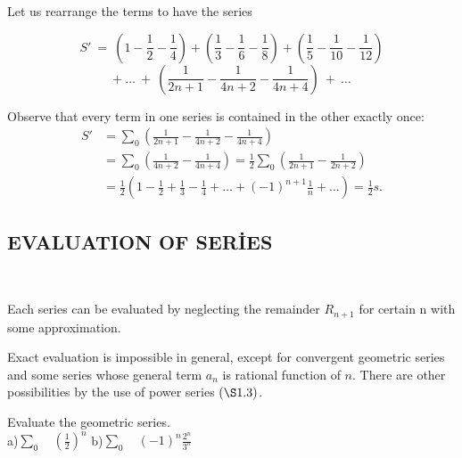 \documentclass[11pt]{amsbook}
\begin{document}
Let us rearrange the terms to have the series 

\[
    S'\:=\:(1-\frac{1}{2} - \frac{1}{4})+(\frac{1}{3} - \frac{1}{6} - \frac{1}{8}) +(\frac{1}{5} - \frac{1}{10} - \frac{1}{12})
\]
\[
    + \:\dots\:+\:(\frac{1}{2n+1} - \frac{1}{4n+2} -\frac{1}{4n+4} ) \:+\:\dots 
\]

Observe that every term in one series is contained in the other exactly once: 
\begin{align*}
    S' &= \sum\limits_{0} \left( \frac{1}{2n+1}-\frac{1}{4n+2}-\frac{1}{4n+4}\right) 
    \\ &= \sum\limits_{0}\left(\frac{1}{4n+2}-\frac{1}{4n+4}\right)=\frac{1}{2}\sum\limits_{0} \left( \frac{1}{2n+1}-\frac{1}{2n+2}\right)
    \\ &= \frac{1}{2}\left(1-\frac{1}{2}+\frac{1}{3}-\frac{1}{4}+\dotsc+\left( -1 \right)^{n+1} \frac{1}{n}+\dotsc \right)=\frac{1}{2} s.
\end{align*}
\subsection{EVALUATION OF SERİES} \ 

Each series can be evaluated by neglecting the remainder $R_{n+1}$ for certain n with some approximation.

Exact evaluation is impossible in general, except for convergent geometric series and some series whose general term $a_n$ is rational function of $n$. There are other possibilities by the use of power series $\left( \S 1.3 \right)$.
\begin{exmp}
Evaluate the geometric series.\\
a)$\sum\limits_{0}\quad \left( \frac{1}{2}\right)^n $ \qquad \qquad \qquad \qquad
b)$\sum\limits_{0}\quad \left(-1\right)^n \frac{2^n}{3^n}$
\end{exmp}
\end{document}
